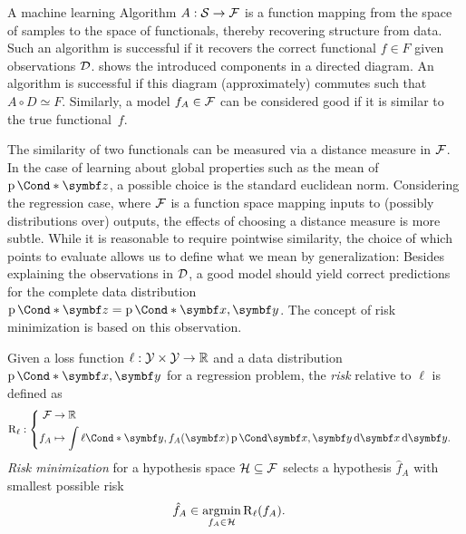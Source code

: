 A machine learning Algorithm $A : \mathcal{S} \to \mathcal{F}$ is a function mapping from the space of samples to the space of functionals, thereby recovering structure from data.
Such an algorithm is successful if it recovers the correct functional $f \in F$ given observations $\mathcal{D}$.
 shows the introduced components in a directed diagram.
An algorithm is successful if this diagram (approximately) commutes such that $A \circ D \simeq F$.
Similarly, a model $f_A \in \mathcal{F}$ can be considered good if it is similar to the true functional~$f$.

The similarity of two functionals can be measured via a distance measure in $\mathcal{F}$.
In the case of learning about global properties such as the mean of $\Prob*{\mat{z}}$, a possible choice is the standard euclidean norm.
Considering the regression case, where $\mathcal{F}$ is a function space mapping inputs to (possibly distributions over) outputs, the effects of choosing a distance measure is more subtle.
While it is reasonable to require pointwise similarity, the choice of which points to evaluate allows us to define what we mean by generalization:
Besides explaining the observations in $\mathcal{D}$, a good model should yield correct predictions for the complete data distribution $\Prob*{\mat{z}} = \Prob*{\mat{x}, \mat{y}}$.
The concept of risk minimization is based on this observation.
\begin{definition}
    \label{def:risk_minimization}
    Given a loss function $\ell: \mathcal{Y} \times \mathcal{Y} \to \mathbb{R}$ and a data distribution $\Prob*{\mat{x}, \mat{y}}$ for a regression problem, the \emph{risk} relative to $\ell$ is defined as
    \begin{align}
        \risk_\ell & : \left\{
        \begin{aligned}
            \Fc & \to \Rb                                                                                              \\
            f_A & \mapsto \int \Fun*{\ell}{\mat{y}, f_A(\mat{x})} \Prob{\mat{x}, \mat{y}} \diff \mat{x} \diff \mat{y}.
        \end{aligned}
        \right.
    \end{align}
    \emph{Risk minimization} for a hypothesis space $\mathcal{H} \subseteq \mathcal{F}$ selects a hypothesis $\hat{f}_A$ with smallest possible risk
    \begin{align}
        \hat{f}_A & \in \operatorname*{argmin}_{f_A \in \mathcal{H}} \operatorname{R}_\ell(f_A).
    \end{align}
\end{definition}

